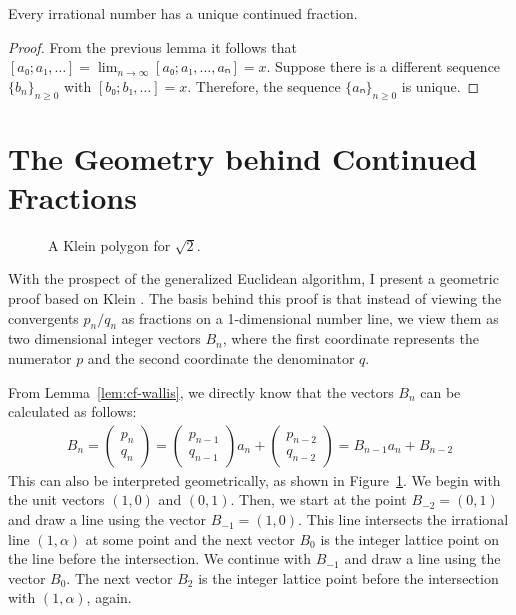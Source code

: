 \begin{theorem}
  \label{thm:irrat-cf}
  Every irrational number has a unique continued fraction.
\end{theorem}

\begin{proof}
  From the previous lemma it follows that $[a₀; a₁, …] = \lim_{n → ∞} [a₀; a₁, …, aₙ] = x$.
  Suppose there is a different sequence $\{b_n\}_{n ≥ 0}$ with $[b₀; b₁, …] = x$.
  Therefore, the sequence $\{aₙ\}_{n ≥ 0}$ is unique.
\end{proof}

\section{The Geometry behind Continued Fractions}

\begin{figure}[tb]
  \centering
  
  \caption{
    A Klein polygon for $\sqrt{2}$.
  }
  \label{fig:klein-polygon}
\end{figure}

With the prospect of the generalized Euclidean algorithm, I present a geometric
proof based on Klein \cite{Klein95}.
The basis behind this proof is that instead of viewing the convergents $p_n/q_n$ as
fractions on a 1-dimensional number line,
we view them as two dimensional integer vectors $B_n$, where the first coordinate
represents the numerator $p$ and the second coordinate the denominator $q$.

From Lemma~\ref{lem:cf-wallis},
we directly know that the vectors $B_n$ can be calculated as follows:
\begin{align*}
  B_n =
  \begin{pmatrix}
    p_n \\ q_n
  \end{pmatrix}
  =
  \begin{pmatrix}
    p_{n-1} \\ q_{n-1}
  \end{pmatrix}
  a_n
  +
  \begin{pmatrix}
    p_{n-2} \\ q_{n-2}
  \end{pmatrix}
  = B_{n-1} a_n + B_{n-2}
\end{align*}
This can also be interpreted geometrically, as shown in Figure~\ref{fig:klein-polygon}.
We begin with the unit vectors $(1, 0)$ and $(0, 1)$.
Then, we start at the point $B_{-2} = (0, 1)$ and draw a line using the vector $B_{-1} = (1, 0)$.
This line intersects the irrational line $(1, α)$ at some point
and the next vector $B_0$ is the integer lattice point on the line before the
intersection.
We continue with $B_{-1}$ and draw a line using the vector $B_0$.
The next vector $B_2$ is the integer lattice point before the intersection with $(1, α)$, again.

